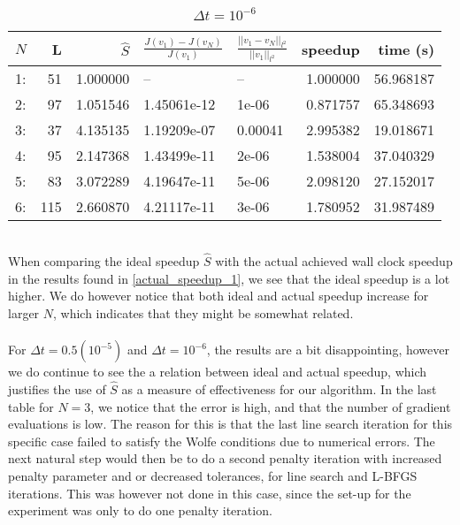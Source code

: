 \begin{table}[h]
\centering
\caption{$\Delta t = 10^{-6}$}
\label{actual_speedup_3}
\begin{tabular}{lrrllrr}
\toprule
{} $N$&   L &        $\hat S$ &          $\frac{J(v_1)-J(v_N)}{J(v_1)}$ &    $\frac{||v_1-v_N||_{l^2}}{||v_1||_{l^2}}$&speedup &       time (s)\\
\midrule
1: &   51 &  1.000000 &           -- &       -- &  1.000000 &  56.968187 \\
2: &   97 &  1.051546 &  1.45061e-12 &    1e-06 &  0.871757 &  65.348693 \\
3: &   37 &  4.135135 &  1.19209e-07 &  0.00041 &  2.995382 &  19.018671 \\
4: &   95 &  2.147368 &  1.43499e-11 &    2e-06 &  1.538004 &  37.040329 \\
5: &   83 &  3.072289 &  4.19647e-11 &    5e-06 &  2.098120 &  27.152017 \\
6: &  115 &  2.660870 &  4.21117e-11 &    3e-06 &  1.780952 &  31.987489 \\
\bottomrule
\end{tabular}
\end{table}
\\
When comparing the ideal speedup $\hat S$ with the actual achieved wall clock speedup in the results found in \ref{actual_speedup_1}, we see that the ideal speedup is a lot higher. We do however notice that both ideal and actual speedup increase for larger $N$, which indicates that they might be somewhat related.
\\
\\
For $\Delta t = 0.5(10^{-5})$ and $\Delta t = 10^{-6}$, the results are a bit disappointing, however we do continue to see the a relation between ideal and actual speedup, which justifies the use of $\hat S$ as a measure of effectiveness for our algorithm. In the last table for $N=3$, we notice that the error is high, and that the number of gradient evaluations is low. The reason for this is that the last line search iteration for this specific case failed to satisfy the Wolfe conditions due to numerical errors. The next natural step would then be to do a second penalty iteration with increased penalty parameter and or decreased tolerances, for line search and L-BFGS iterations. This was however not done in this case, since the set-up for the experiment was only to do one penalty iteration.
